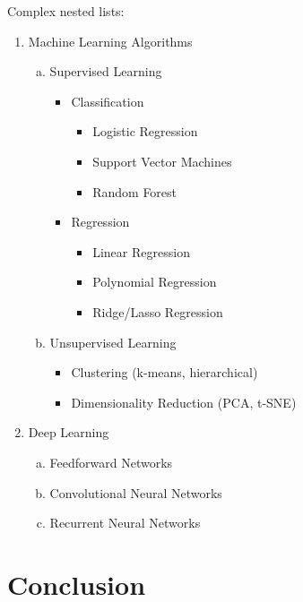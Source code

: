 \documentclass[12pt,a4paper,twoside]{article}
\theoremstyle{definition}
\begin{document}
Complex nested lists:
\begin{enumerate}
\item Machine Learning Algorithms
    \begin{enumerate}[(a)]
    \item Supervised Learning
        \begin{itemize}
        \item Classification
            \begin{itemize}
            \item Logistic Regression
            \item Support Vector Machines
            \item Random Forest
            \end{itemize}
        \item Regression
            \begin{itemize}
            \item Linear Regression
            \item Polynomial Regression
            \item Ridge/Lasso Regression
            \end{itemize}
        \end{itemize}
    \item Unsupervised Learning
        \begin{itemize}
        \item Clustering (k-means, hierarchical)
        \item Dimensionality Reduction (PCA, t-SNE)
        \end{itemize}
    \end{enumerate}
\item Deep Learning
    \begin{enumerate}[(a)]
    \item Feedforward Networks
    \item Convolutional Neural Networks
    \item Recurrent Neural Networks
    \end{enumerate}
\end{enumerate}

\section{Conclusion}
\end{document}
